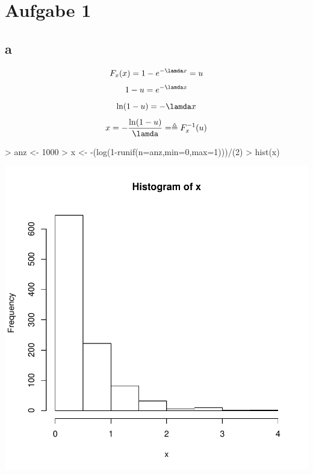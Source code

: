 

\section{Aufgabe 1}

\subsection{a}
\[ F_x(x) = 1 - e^{-\lamda x} = u \]
\[ 1 - u = e^{-\lamda x} \]
\[ \ln(1-u) = -\lamda x \]
\[ x = -\frac{\ln(1-u)}{\lamda} = \triangleq F_x^{-1}(u) \]
\begin{Schunk}
\begin{Sinput}
> anz <- 1000
> x <- -(log(1-runif(n=anz,min=0,max=1)))/(2)
> hist(x)
\end{Sinput}
\end{Schunk}
\includegraphics{sw08_1-001}

